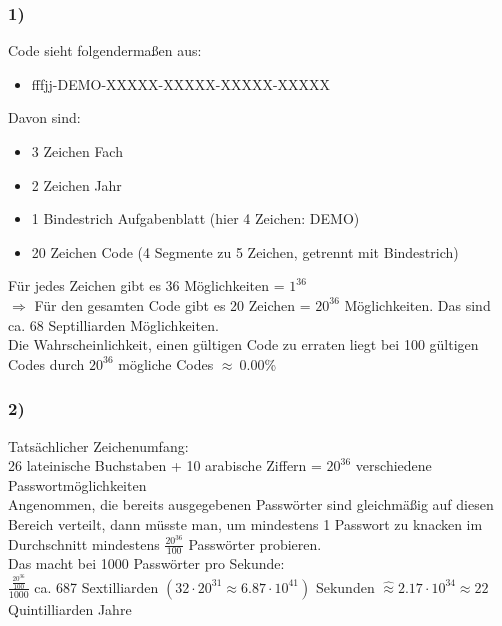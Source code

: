 \documentclass{article}
\begin{document}
\subsubsection*{1)}
Code sieht folgendermaßen aus:
\begin{itemize}
    \item fffjj-DEMO-XXXXX-XXXXX-XXXXX-XXXXX
\end{itemize}
Davon sind:
\begin{itemize}
    \item 3 Zeichen Fach
    \item 2  Zeichen Jahr
    \item 1 Bindestrich Aufgabenblatt (hier 4 Zeichen: DEMO)
    \item 20 Zeichen Code (4 Segmente zu 5 Zeichen, getrennt mit Bindestrich)
\end{itemize}
Für jedes Zeichen gibt es 36 Möglichkeiten = $1^{36}$\\
$\Rightarrow$ Für den gesamten Code gibt es 20 Zeichen = $20^{36}$ Möglichkeiten.
Das sind ca. 68 Septilliarden Möglichkeiten.\\
Die Wahrscheinlichkeit, einen gültigen Code zu erraten liegt bei 100 gültigen Codes durch $20^{36}$ mögliche Codes $\approx~0.00$\%
\subsubsection*{2)}
Tatsächlicher Zeichenumfang:\\
26 lateinische Buchstaben + 10 arabische Ziffern
= $20^{36}$ verschiedene Passwortmöglichkeiten\\
Angenommen, die bereits ausgegebenen Passwörter sind gleichmäßig auf diesen Bereich verteilt, dann müsste man, um mindestens 1 Passwort zu knacken im Durchschnitt mindestens $\frac{20^{36}}{100}$ Passwörter probieren.\\
Das macht bei 1000 Passwörter pro Sekunde:\\
$\frac{\frac{20^{36}}{100}}{1000}$ ca. 687 Sextilliarden $(32\cdot20^{31}\approx6.87\cdot10^{41})$ Sekunden $\widehat{\approx} 2.17\cdot10^{34}\approx22$ Quintilliarden Jahre\\
\newpage
\end{document}
